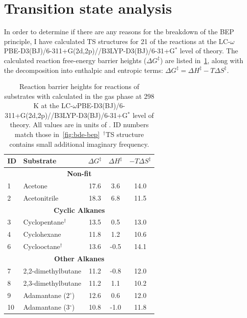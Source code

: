 \newpage
\section{Transition state analysis}

In order to determine if there are any reasons for the breakdown of the BEP principle, I have calculated TS structures for 21 of the reactions at the LC-$\omega$PBE-D3(BJ)/6-311+G(2d,2p)//B3LYP-D3(BJ)/6-31+G$^*$ level of theory. The calculated reaction free-energy barrier heights ($\Delta G^\ddagger$) are listed in~\ref{tab:ts-bep}, along with the decomposition into enthalpic and entropic terms: $\Delta G^\ddagger = \Delta H^\ddagger - T\Delta S^\ddagger$.

\begin{table}[!htbp]
  \caption[Reaction barrier heights for reactions of substrates with \cumo calculated in the gas phase at 298 K.]{Reaction barrier heights for reactions of substrates with \cumo calculated in the gas phase at 298 K at the LC-$\omega$PBE-D3(BJ)/6-311+G(2d,2p)//B3LYP-D3(BJ)/6-31+G$^*$ level of theory. All values are in units of \kcalmol. ID numbers match those in~\protect\ref{fig:bde-bep}\ $^\dagger$TS structure contains small additional imaginary frequency.}
  \label{tab:ts-bep}
  \begin{tabular}{l l c c c}
    ID & Substrate & $\Delta G^\ddagger$ & $\Delta H^\ddagger$ & $-T\Delta S^\ddagger$ \\
    \hline
    \multicolumn{5}{c}{\textbf{Non-fit}}\\
    1 & Acetone & 17.6 & 3.6 & 14.0 \\
    2 & Acetonitrile & 18.3 & 6.8 & 11.5 \\
    \hline
    \multicolumn{5}{c}{\textbf{ Cyclic Alkanes}}\\
    3 & Cyclopentane$^\dagger$ & 13.5 & 0.5 & 13.0 \\
    4 & Cyclohexane & 11.8 & 1.2 & 10.6 \\
    6 & Cyclooctane$^\dagger$ & 13.6 & -0.5 & 14.1 \\
    \hline
    \multicolumn{5}{c}{\textbf{Other Alkanes}}\\
    7 & 2,2-dimethylbutane & 11.2 & -0.8 & 12.0 \\
    8 & 2,3-dimethylbutane & 11.2 & 1.1 & 10.2 \\
    9 & Adamantane (2$^\circ$) & 12.6 & 0.6 & 12.0 \\
    10 & Adamantane (3$^\circ$) & 10.8 & -1.0 & 11.8 \\
    \hline

\end{tabular}
\end{table}
